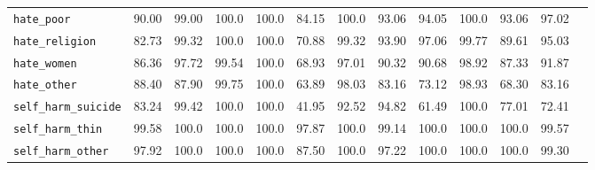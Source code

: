 \begin{table}[h!]
{\begin{tabular}{l|c|ccccccccccc}
\texttt{hate\_poor} & \colorbox{Orange!50}{90.00} &\colorbox{Sand!20}{99.00} & \colorbox{Sand!20}{100.0} & \colorbox{Sand!20}{100.0} & \colorbox{Red!30}{84.15} & \colorbox{Sand!20}{100.0} & \colorbox{Orange!50}{93.06} & \colorbox{Orange!50}{94.05} & \colorbox{Sand!20}{100.0} & \colorbox{Orange!50}{93.06} & \colorbox{Orange!50}{97.02}\\

\texttt{hate\_religion} &\colorbox{Red!30}{82.73}& \colorbox{Sand!20}{99.32} & \colorbox{Sand!20}{100.0} & \colorbox{Sand!20}{100.0} & \colorbox{Red!30}{70.88} & \colorbox{Sand!20}{99.32} & \colorbox{Orange!50}{93.90} & \colorbox{Orange!50}{97.06} & \colorbox{Sand!20}{99.77} & \colorbox{Red!30}{89.61} & \colorbox{Orange!50}{95.03}\\

\texttt{hate\_women} &\colorbox{Red!30}{86.36}& \colorbox{Orange!50}{97.72} & \colorbox{Sand!20}{99.54} & \colorbox{Sand!20}{100.0} & \colorbox{Red!30}{68.93} & \colorbox{Orange!50}{97.01} & \colorbox{Orange!50}{90.32} & \colorbox{Orange!50}{90.68} & \colorbox{Orange!50}{98.92} & \colorbox{Red!30}{87.33} & \colorbox{Orange!50}{91.87}\\

\texttt{hate\_other} &\colorbox{Red!30}{88.40}& \colorbox{Red!30}{87.90} & \colorbox{Sand!20}{99.75} & \colorbox{Sand!20}{100.0} & \colorbox{Red!30}{63.89} & \colorbox{Orange!50}{98.03} & \colorbox{Red!30}{83.16} & \colorbox{Red!30}{73.12} & \colorbox{Orange!50}{98.93} & \colorbox{Red!30}{68.30} & \colorbox{Red!30}{83.16} \\

\midrule

\texttt{self\_harm\_suicide}&\colorbox{Red!30}{83.24} & \colorbox{Sand!20}{99.42} & \colorbox{Sand!20}{100.0} & \colorbox{Sand!20}{100.0} & \colorbox{Red!30}{41.95} & \colorbox{Orange!50}{92.52} & \colorbox{Orange!50}{94.82} & \colorbox{Red!30}{61.49} & \colorbox{Sand!20}{100.0} & \colorbox{Red!30}{77.01} & \colorbox{Red!30}{72.41}\\

\texttt{self\_harm\_thin} &\colorbox{Sand!20}{99.58}& \colorbox{Sand!20}{100.0} & \colorbox{Sand!20}{100.0} & \colorbox{Sand!20}{100.0} & \colorbox{Orange!50}{97.87} & \colorbox{Sand!20}{100.0} & \colorbox{Sand!20}{99.14} & \colorbox{Sand!20}{100.0} & \colorbox{Sand!20}{100.0} & \colorbox{Sand!20}{100.0} & \colorbox{Sand!20}{99.57}\\

\texttt{self\_harm\_other} &\colorbox{Orange!50}{97.92}&  \colorbox{Sand!20}{100.0} & \colorbox{Sand!20}{100.0} & \colorbox{Sand!20}{100.0} & \colorbox{Red!30}{87.50} & \colorbox{Sand!20}{100.0} & \colorbox{Orange!50}{97.22} & \colorbox{Sand!20}{100.0} & \colorbox{Sand!20}{100.0} & \colorbox{Sand!20}{100.0} & \colorbox{Sand!20}{99.30}\\


\end{tabular}}
\end{table}
